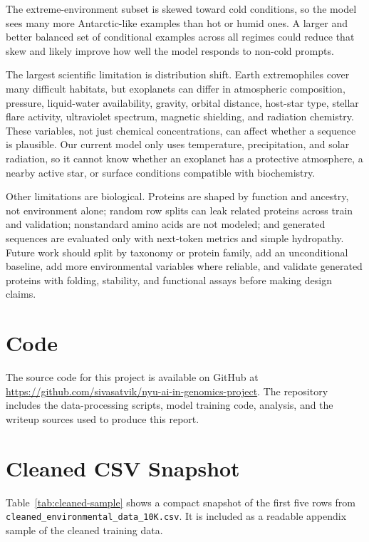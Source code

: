 \documentclass[11pt]{article}
\begin{document}
The extreme-environment subset is skewed toward cold conditions, so the
model sees many more Antarctic-like examples than hot or humid ones. A larger
and better balanced set of conditional examples across all regimes could reduce
that skew and likely improve how well the model responds to non-cold prompts.

The largest scientific limitation is distribution shift. Earth extremophiles
cover many difficult habitats, but exoplanets can differ in atmospheric
composition, pressure, liquid-water availability, gravity, orbital distance,
host-star type, stellar flare activity, ultraviolet spectrum, magnetic shielding,
and radiation chemistry. These variables, not just chemical concentrations, can
affect whether a sequence is plausible. Our current model only uses
temperature, precipitation, and solar radiation, so it cannot know whether an
exoplanet has a protective atmosphere, a nearby active star, or surface
conditions compatible with biochemistry.

Other limitations are biological. Proteins are shaped by function and ancestry,
not environment alone; random row splits can leak related proteins across train
and validation; nonstandard amino acids are not modeled; and generated sequences
are evaluated only with next-token metrics and simple hydropathy. Future work
should split by taxonomy or protein family, add an unconditional baseline, add
more environmental variables where reliable, and validate generated proteins
with folding, stability, and functional assays before making design claims.

\section{Code}
The source code for this project is available on GitHub at
\url{https://github.com/sivasatvik/nyu-ai-in-genomics-project}. The repository
includes the data-processing scripts, model training code, analysis,
and the writeup sources used to produce this report.

\clearpage
\appendix

\section{Cleaned CSV Snapshot}
\label{app:cleaned-sample}

Table~\ref{tab:cleaned-sample} shows a compact snapshot of the first five rows
from \texttt{cleaned\_environmental\_data\_10K.csv}. It is included as a
readable appendix sample of the cleaned training data.
\end{document}
